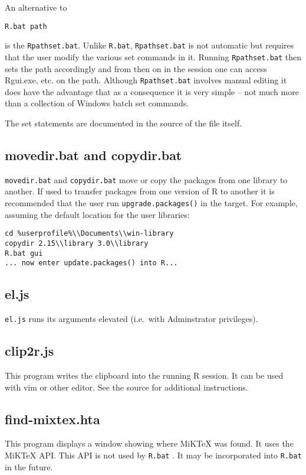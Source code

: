 An alternative to

\begin{verbatim}
R.bat path
\end{verbatim}

is the \texttt{Rpathset.bat}. Unlike \texttt{R.bat},
\texttt{Rpathset.bat} is not automatic but requires that the user modify
the various set commands in it. Running \texttt{Rpathset.bat} then sets
the path accordingly and from then on in the session one can access
Rgui.exe, etc. on the path. Although \texttt{Rpathset.bat} involves
manual editing it does have the advantage that as a consequence it is
very simple -- not much more than a collection of Windows batch set
commands.

The set statements are documented in the source of the file itself.

\subsection{movedir.bat and copydir.bat}

\texttt{movedir.bat} and \texttt{copydir.bat} move or copy the packages
from one library to another. If used to transfer packages from one
version of R to another it is recommended that the user run
\texttt{upgrade.packages()} in the target. For example, assuming the
default location for the user libraries:

\begin{verbatim}
cd %userprofile%\\Documents\\win-library
copydir 2.15\\library 3.0\\library
R.bat gui
... now enter update.packages() into R...
\end{verbatim}

\subsection{el.js}

\texttt{el.js} runs its arguments elevated (i.e.~with Adminstrator
privileges).

\subsection{clip2r.js}

This program writes the clipboard into the running R session. It can be
used with vim or other editor. See the source for additional
instructions.

\subsection{find-mixtex.hta}

This program displays a window showing where MiKTeX was found. It uses
the MiKTeX API. This API is not used by \texttt{R.bat} . It may be
incorporated into \texttt{R.bat} in the future.
